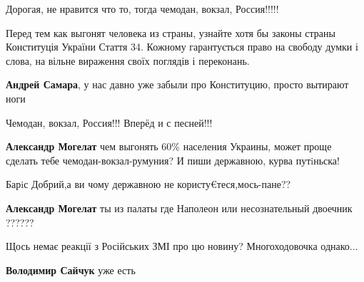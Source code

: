 \begin{itemize}
Дорогая, не нравится что то, тогда чемодан, вокзал, Россия!!!!!

\begin{itemize}

Перед тем как выгонят человека из страны, узнайте хотя бы законы страны
Конституція України
Стаття 34.
Кожному гарантується право на свободу думки і слова, на вільне вираження своїх поглядів і переконань.


\textbf{Андрей Самара}, у нас давно уже забыли про Конституцию, просто вытирают ноги
\end{itemize}


Чемодан, вокзал, Россия!!! Вперёд и с песней!!!

\begin{itemize}

\textbf{Александр Могелат} чем выгонять 60\% населения Украины, может проще сделать тебе чемодан-вокзал-румуния?
И пиши державною, курва путiньска!


Барiс Добрий,а ви чому державною не користу€теся,мось-пане??


\textbf{Александр Могелат} ты из палаты где Наполеон или несознательный двоечник ??????
\end{itemize}


Щось немає реакції з Російських ЗМІ про цю новину? Многоходовочка однако...

\begin{itemize}

\textbf{Володимир Сайчук} уже есть


\end{itemize}
\end{itemize}
